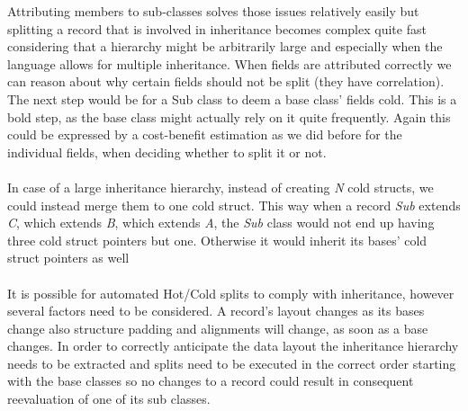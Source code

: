 Attributing members to sub-classes solves those issues relatively easily but splitting a record that is involved in inheritance becomes complex quite fast considering that a hierarchy might be arbitrarily large and especially when the language allows for multiple inheritance. When fields are attributed correctly we can reason about why certain fields should not be split (they have correlation). The next step would be for a Sub class to deem a base class' fields cold. This is a bold step, as the base class might actually rely on it quite frequently. Again this could be expressed by a cost-benefit estimation as we did before for the individual fields, when deciding whether to split it or not.\\\\
In case of a large inheritance hierarchy, instead of creating \textit{N} cold structs, we could instead merge them to one cold struct. This way when a record \textit{Sub} extends \textit{C}, which extends \textit{B}, which extends \textit{A}, the \textit{Sub} class would not end up having three cold struct pointers but one. Otherwise it would inherit its bases' cold struct pointers as well\\\\
It is possible for automated Hot/Cold splits to comply with inheritance, however several factors need to be considered. A record's layout changes as its bases change also structure padding and alignments will change, as soon as a base changes. In order to correctly anticipate the data layout the inheritance hierarchy needs to be extracted and splits need to be executed in the correct order starting with the base classes so no changes to a record could result in consequent reevaluation of one of its sub classes.

